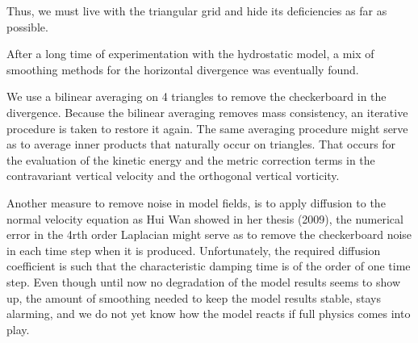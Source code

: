 Thus, we must live with the triangular grid and hide its deficiencies as far as possible. 

After a long time of experimentation with the hydrostatic model,
a mix of smoothing methods for the horizontal divergence was eventually found.

We use a bilinear averaging on 4 triangles to remove the checkerboard
in the divergence. Because the bilinear averaging removes mass consistency,
an iterative procedure is taken to restore it again.
The same averaging procedure might serve as to average inner products
that naturally occur on triangles. That occurs for the evaluation
of the kinetic energy and the metric correction terms in the contravariant
vertical velocity and the orthogonal vertical vorticity.

Another measure to remove noise in model fields, is to apply diffusion
to the normal velocity equation as Hui Wan showed in her thesis (2009),
the numerical error in the 4rth order Laplacian might serve as to
remove the checkerboard noise in each time step when it is produced.
Unfortunately, the required diffusion coefficient is such that the
characteristic damping time is of the order of one time step. Even though until now
no degradation of the model results seems to show up, the amount of
smoothing needed to keep the model results stable, stays alarming,
and we do not yet know how the model reacts if full physics comes into play.
